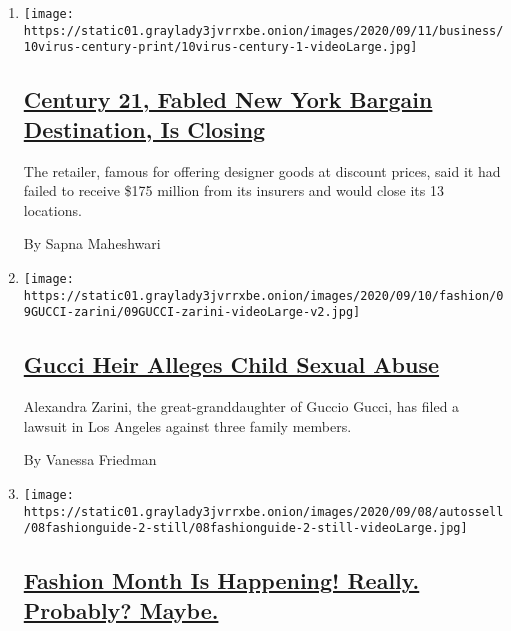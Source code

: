 \begin{enumerate}
\def\labelenumi{\arabic{enumi}.}
\item
  \texttt{[image: https://static01.graylady3jvrrxbe.onion/images/2020/09/11/business/10virus-century-print/10virus-century-1-videoLarge.jpg]}

  \hypertarget{century-21-fabled-new-york-bargain-destination-is-closing}{%
  \subsection{\texorpdfstring{\href{/2020/09/10/business/century-21-bankruptcy-closing.html}{Century
  21, Fabled New York Bargain Destination, Is
  Closing}}{Century 21, Fabled New York Bargain Destination, Is Closing}}\label{century-21-fabled-new-york-bargain-destination-is-closing}}

  The retailer, famous for offering designer goods at discount prices,
  said it had failed to receive \$175 million from its insurers and
  would close its 13 locations.

  By Sapna Maheshwari
\item
  \texttt{[image: https://static01.graylady3jvrrxbe.onion/images/2020/09/10/fashion/09GUCCI-zarini/09GUCCI-zarini-videoLarge-v2.jpg]}

  \hypertarget{gucci-heir-alleges-child-sexual-abuse}{%
  \subsection{\texorpdfstring{\href{/2020/09/09/style/gucci-family-lawsuit.html}{Gucci
  Heir Alleges Child Sexual
  Abuse}}{Gucci Heir Alleges Child Sexual Abuse}}\label{gucci-heir-alleges-child-sexual-abuse}}

  Alexandra Zarini, the great-granddaughter of Guccio Gucci, has filed a
  lawsuit in Los Angeles against three family members.

  By Vanessa Friedman
\item
  \texttt{[image: https://static01.graylady3jvrrxbe.onion/images/2020/09/08/autossell/08fashionguide-2-still/08fashionguide-2-still-videoLarge.jpg]}

  \hypertarget{fashion-month-is-happening-really-probably-maybe}{%
  \subsection{\texorpdfstring{\href{/2020/09/08/style/fashion-month-schedule.html}{Fashion
  Month Is Happening! Really. Probably?
  Maybe.}}{Fashion Month Is Happening! Really. Probably? Maybe.}}\label{fashion-month-is-happening-really-probably-maybe}}


\end{enumerate}
